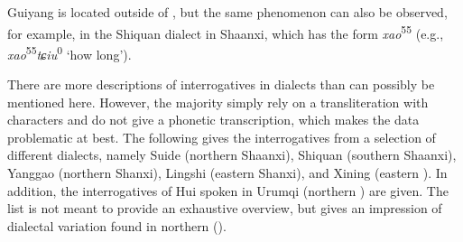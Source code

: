 \noindent Guiyang is located outside of , but the same phenomenon can also be observed, for example, in the Shiquan dialect in Shaanxi, which has the form \textit{xao}\textsuperscript{55}  (e.g., \textit{xao}\textsuperscript{55}\textit{tɕ}\textit{iu}\textsuperscript{0}  ‘how long’).

There are more descriptions of interrogatives in  dialects than can possibly be mentioned here. However, the majority simply rely on a transliteration with characters and do not give a phonetic transcription, which makes the data problematic at best. The following gives the interrogatives from a selection of different dialects, namely Suide  (northern Shaanxi), Shiquan  (southern Shaanxi), Yanggao  (northern Shanxi), Lingshi  (eastern Shanxi), and Xining  (eastern ). In addition, the interrogatives of Hui  spoken in Urumqi  (northern ) are given. The list is not meant to provide an exhaustive overview, but gives an impression of dialectal variation found in northern  ().

